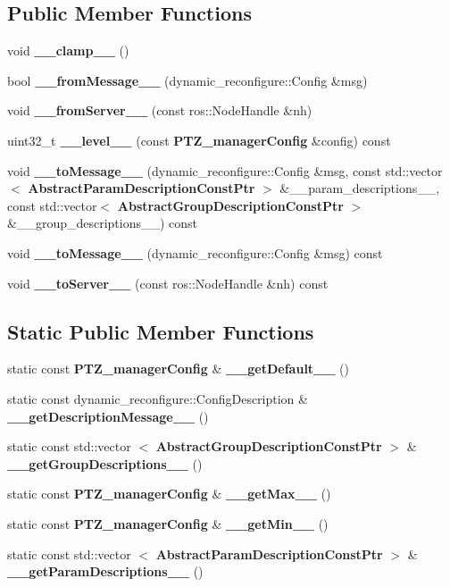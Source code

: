 \subsection*{\-Public \-Member \-Functions}
\begin{DoxyCompactItemize}
\item 
void {\bf \-\_\-\-\_\-clamp\-\_\-\-\_\-} ()
\item 
bool {\bf \-\_\-\-\_\-from\-Message\-\_\-\-\_\-} (dynamic\-\_\-reconfigure\-::\-Config \&msg)
\item 
void {\bf \-\_\-\-\_\-from\-Server\-\_\-\-\_\-} (const ros\-::\-Node\-Handle \&nh)
\item 
uint32\-\_\-t {\bf \-\_\-\-\_\-level\-\_\-\-\_\-} (const {\bf \-P\-T\-Z\-\_\-manager\-Config} \&config) const 
\item 
void {\bf \-\_\-\-\_\-to\-Message\-\_\-\-\_\-} (dynamic\-\_\-reconfigure\-::\-Config \&msg, const std\-::vector$<$ {\bf \-Abstract\-Param\-Description\-Const\-Ptr} $>$ \&\-\_\-\-\_\-param\-\_\-descriptions\-\_\-\-\_\-, const std\-::vector$<$ {\bf \-Abstract\-Group\-Description\-Const\-Ptr} $>$ \&\-\_\-\-\_\-group\-\_\-descriptions\-\_\-\-\_\-) const 
\item 
void {\bf \-\_\-\-\_\-to\-Message\-\_\-\-\_\-} (dynamic\-\_\-reconfigure\-::\-Config \&msg) const 
\item 
void {\bf \-\_\-\-\_\-to\-Server\-\_\-\-\_\-} (const ros\-::\-Node\-Handle \&nh) const 
\end{DoxyCompactItemize}
\subsection*{\-Static \-Public \-Member \-Functions}
\begin{DoxyCompactItemize}
\item 
static const {\bf \-P\-T\-Z\-\_\-manager\-Config} \& {\bf \-\_\-\-\_\-get\-Default\-\_\-\-\_\-} ()
\item 
static const \*
dynamic\-\_\-reconfigure\-::\-Config\-Description \& {\bf \-\_\-\-\_\-get\-Description\-Message\-\_\-\-\_\-} ()
\item 
static const std\-::vector\*
$<$ {\bf \-Abstract\-Group\-Description\-Const\-Ptr} $>$ \& {\bf \-\_\-\-\_\-get\-Group\-Descriptions\-\_\-\-\_\-} ()
\item 
static const {\bf \-P\-T\-Z\-\_\-manager\-Config} \& {\bf \-\_\-\-\_\-get\-Max\-\_\-\-\_\-} ()
\item 
static const {\bf \-P\-T\-Z\-\_\-manager\-Config} \& {\bf \-\_\-\-\_\-get\-Min\-\_\-\-\_\-} ()
\item 
static const std\-::vector\*
$<$ {\bf \-Abstract\-Param\-Description\-Const\-Ptr} $>$ \& {\bf \-\_\-\-\_\-get\-Param\-Descriptions\-\_\-\-\_\-} ()
\end{DoxyCompactItemize}
